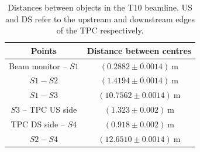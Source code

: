 \begin{table}
  \centering
  \caption{Distances between objects in the T10 beamline. US and DS refer to the upstream and downstream edges of the TPC respectively.}
  \begin{tabular}{|c c|}
    \hline
    \hline
    Points & Distance between centres\\
    \hline
    Beam monitor -- $\mathit{S1}$ & $(0.2882 \pm 0.0014)~\text{m}$ \\
    $\mathit{S1}-\mathit{S2}$ & $(1.4194 \pm 0.0014)~\text{m}$ \\
    $\mathit{S1}-\mathit{S3}$ & $(10.7562 \pm 0.0014)~\text{m}$ \\
    $\mathit{S3}$ -- TPC US side & $(1.323 \pm 0.002)~\text{m}$ \\
    TPC DS side -- $\mathit{S4}$ & $(0.918 \pm 0.002)~\text{m}$ \\
    $\mathit{S2}-\mathit{S4}$ & $(12.6510 \pm 0.0014)~\text{m}$ \\
    \hline    
  \end{tabular}
  \label{tab:distances}
\end{table}



